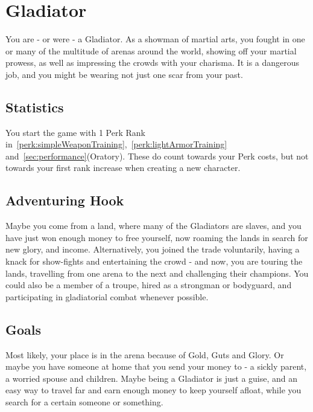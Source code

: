 \section{Gladiator}\label{background:gladiator}
You are - or were - a Gladiator.
As a showman of martial arts, you fought in one or many of the multitude of arenas around the world, showing off your martial prowess, as well as impressing the crowds with your charisma.
It is a dangerous job, and you might be wearing not just one scar from your past.

\subsection{Statistics}
You start the game with 1 Perk Rank in~\ref{perk:simpleWeaponTraining},~\ref{perk:lightArmorTraining} and~\ref{sec:performance}(Oratory).
These do count towards your Perk costs, but not towards your first rank increase when creating a new character.

\subsection{Adventuring Hook}
Maybe you come from a land, where many of the Gladiators are slaves, and you have just won enough money to free yourself, now roaming the lands in search for new glory, and income.
Alternatively, you joined the trade voluntarily, having a knack for show-fights and entertaining the crowd - and now, you are touring the lands, travelling from one arena to the next and challenging their champions.
You could also be a member of a troupe, hired as a strongman or bodyguard, and participating in gladiatorial combat whenever possible.

\subsection{Goals}
Most likely, your place is in the arena because of Gold, Guts and Glory.
Or maybe you have someone at home that you send your money to - a sickly parent, a worried spouse and children.
Maybe being a Gladiator is just a guise, and an easy way to travel far and earn enough money to keep yourself afloat, while you search for a certain someone or something.